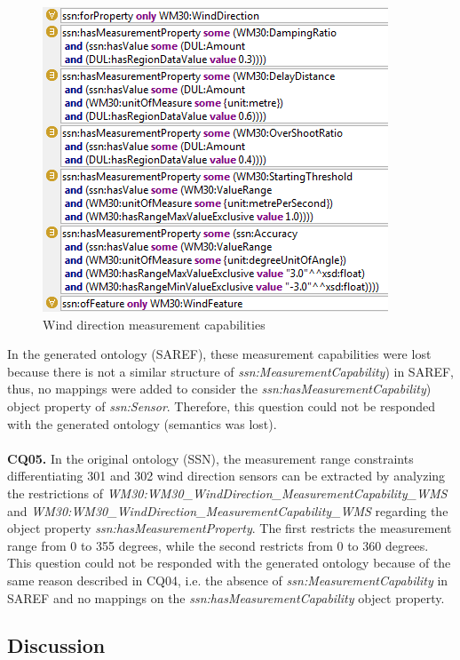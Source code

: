 \documentclass{sig-alternate-05-2015}
\begin{document}
\begin{figure}[h!]
\centering
\includegraphics[scale=0.87]{SSN_MeasurementCapability}
\caption{Wind direction measurement capabilities} 
\label{fig:SSN_MeasurementCapability}
\end{figure}

In the generated ontology (SAREF), these measurement capabilities were lost because there is not a similar structure of \textit{ssn:\-MeasurementCapability}) in SAREF, thus, no mappings were added to consider the  \textit{ssn:\-hasMeasurementCapability}) object property of \textit{ssn:\-Sensor}. Therefore, this question could not be responded with the generated ontology (semantics was lost).  
\\\\\textbf{CQ05.} In the original ontology (SSN), the measurement range constraints differentiating 301 and 302 wind direction sensors can be extracted by analyzing the restrictions of \textit{WM30:\-WM30\-\_Wind\-Direction\-\_Measurement\-Capability\-\_WMS} and \textit{WM30:\-WM30\-\_Wind\-Direction\-\_Measurement\-Capability\-\_WMS} regarding the object property \textit{ssn:\-has\-Measurement\-Property}. The first restricts the measurement range from 0 to 355 degrees, while the second restricts from 0 to 360 degrees. This question could not be responded with the generated ontology because of the same reason described in CQ04, i.e. the absence of \textit{ssn:\-MeasurementCapability} in SAREF and no mappings on the \textit{ssn:\-hasMeasurementCapability} object property.


\subsection{Discussion}
\end{document}
